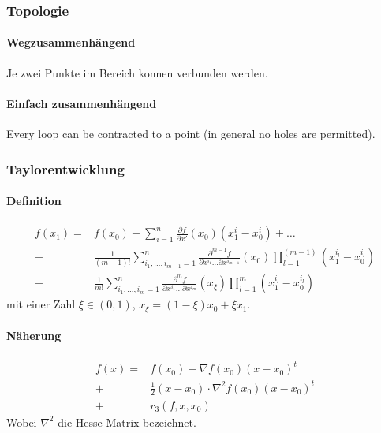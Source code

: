 \documentclass[a4paper, 9pt, DIV=24]{scrartcl}
\begin{document}
\subsubsection*{Topologie}
\paragraph*{Wegzusammenhängend} Je zwei Punkte im Bereich konnen verbunden werden.
\paragraph*{Einfach zusammenhängend} Every loop can be contracted to a point (in general no holes are permitted).

\subsubsection{Taylorentwicklung}
\paragraph*{Definition}
\begin{align*}
f\left( {{x_1}} \right) = & f\left( {{x_0}} \right) + \sum\limits_{i = 1}^n {\frac{{\partial f}}{{\partial x'}}\left( {{x_0}} \right)\left( {x_1^i - x_0^i} \right) + \ldots } \\
 + & \frac{1}{{\left( {m - 1} \right)!}}\sum\limits_{{i_1}, \ldots ,{i_{m - 1}} = 1}^n {\frac{{{\partial ^{m - 1}}f}}{{\partial {x^{{i_1}}} \ldots \partial {x^{{i_{m - 1}}}}}}\left( {{x_0}} \right)\prod\limits_{l = 1}^{\left( {m - 1} \right)} {\left( {x_1^{{i_l}} - x_0^{{i_l}}} \right)} } \\
 + & \frac{1}{{m!}}\sum\limits_{{i_1}, \ldots ,{i_m} = 1}^n {\frac{{{\partial ^m}f}}{{\partial {x^{{i_1}}} \ldots \partial {x^{{i_m}}}}}\left( {{x_\xi }} \right)\prod\limits_{l = 1}^m {\left( {x_1^{{i_l}} - x_0^{{i_l}}} \right)} }
\end{align*}
mit einer Zahl $\xi\in\left( 0,1\right)$, $x_\xi = \left( 1-\xi\right)x_0+\xi x_1$.
\paragraph*{Näherung}
\begin{align*}
f(x) = & f\left( x_0\right) + \nabla f\left( x_0\right) \left( x-x_0\right)^t\\
+ & \frac{1}{2}\left( x-x_0\right)\cdot\nabla^2 f\left( x_0\right)\left( x-x_0\right)^t\\
+ & r_3\left( f,x,x_0\right)
\end{align*}
Wobei $\nabla^2$ die Hesse-Matrix bezeichnet. 
\end{document}
